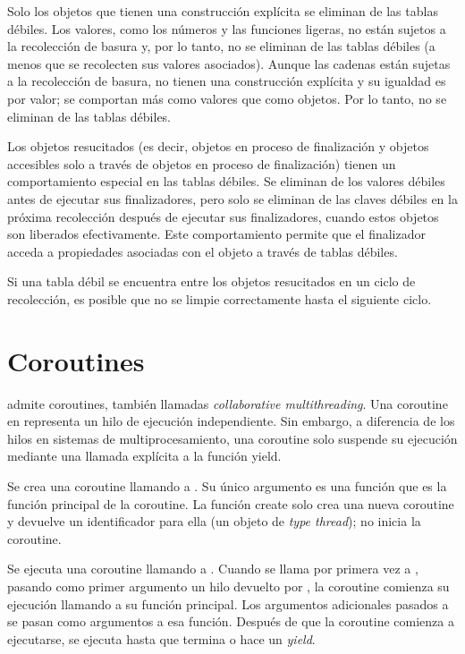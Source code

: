 Solo los objetos que tienen una construcción explícita se eliminan de las tablas débiles. Los valores, como los números y las funciones  ligeras, no están sujetos a la recolección de basura y, por lo tanto, no se eliminan de las tablas débiles (a menos que se recolecten sus valores asociados). Aunque las cadenas están sujetas a la recolección de basura, no tienen una construcción explícita y su igualdad es por valor; se comportan más como valores que como objetos. Por lo tanto, no se eliminan de las tablas débiles.

Los objetos resucitados (es decir, objetos en proceso de finalización y objetos accesibles solo a través de objetos en proceso de finalización) tienen un comportamiento especial en las tablas débiles. Se eliminan de los valores débiles antes de ejecutar sus finalizadores, pero solo se eliminan de las claves débiles en la próxima recolección después de ejecutar sus finalizadores, cuando estos objetos son liberados efectivamente. Este comportamiento permite que el finalizador acceda a propiedades asociadas con el objeto a través de tablas débiles.

Si una tabla débil se encuentra entre los objetos resucitados en un ciclo de recolección, es posible que no se limpie correctamente hasta el siguiente ciclo.

\section{Coroutines}

 admite coroutines, también llamadas \textit{collaborative multithreading}. Una coroutine en   representa un hilo de ejecución independiente. Sin embargo, a diferencia de los hilos en sistemas de multiprocesamiento, una coroutine solo suspende su ejecución mediante una llamada explícita a la función yield.

Se crea una coroutine llamando a . Su único argumento es una función que es la función principal de la coroutine. La función create solo crea una nueva coroutine y devuelve un identificador para ella (un objeto de \textit{type thread}); no inicia la coroutine.

Se ejecuta una coroutine llamando a . Cuando se llama por primera vez a , pasando como primer argumento un hilo devuelto por , la coroutine comienza su ejecución llamando a su función principal. Los argumentos adicionales pasados a  se pasan como argumentos a esa función. Después de que la coroutine comienza a ejecutarse, se ejecuta hasta que termina o hace un \textit{yield}.

